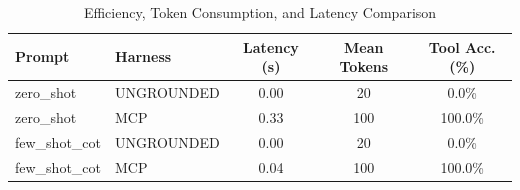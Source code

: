 \begin{table}[ht]
\centering
\small
\caption{Efficiency, Token Consumption, and Latency Comparison}
\label{tab:assistant_efficiency}
\begin{tabular}{llccc}
\toprule
\textbf{Prompt} & \textbf{Harness} & \textbf{Latency (s)} & \textbf{Mean Tokens} & \textbf{Tool Acc. (\%)} \\
\midrule
zero\_shot & UNGROUNDED & 0.00 & 20 & 0.0\% \\
zero\_shot & MCP & 0.33 & 100 & 100.0\% \\
few\_shot\_cot & UNGROUNDED & 0.00 & 20 & 0.0\% \\
few\_shot\_cot & MCP & 0.04 & 100 & 100.0\% \\
\bottomrule
\end{tabular}
\end{table}
